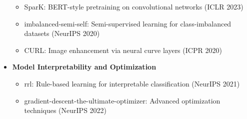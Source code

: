 \begin{itemize}
\begin{itemize}
        \item SparK: BERT-style pretraining on convolutional networks (ICLR 2023)
        \item imbalanced-semi-self: Semi-supervised learning for class-imbalanced datasets (NeurIPS 2020)
        \item CURL: Image enhancement via neural curve layers (ICPR 2020)
    \end{itemize}
    \item \textbf{Model Interpretability and Optimization}
    \begin{itemize}
        \item rrl: Rule-based learning for interpretable classification (NeurIPS 2021)
        \item gradient-descent-the-ultimate-optimizer: Advanced optimization techniques (NeurIPS 2022)
    \end{itemize}
\end{itemize}

